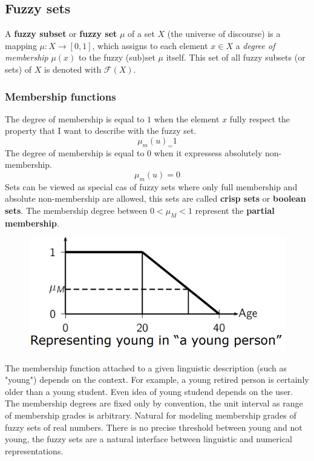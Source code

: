 \documentclass{article}
\begin{document}
\subsection{Fuzzy sets}
A \textbf{fuzzy subset} or \textbf{fuzzy set} $\mu$ of a set $X$ (the universe of
discourse) is a mapping $\mu : X\rightarrow [0,1]$, which assigns to each element $x\in X$
a \textit{degree of membership} $\mu(x)$ to the fuzzy (sub)set $\mu$ itself.
\newline\newline
This set of all fuzzy subsets (or sets) of $X$ is denoted with $\mathcal{F}(X)$.

\subsubsection{Membership functions}
The degree of membership is equal to $1$ when the element $x$ fully respect the property
that I want to describe with the fuzzy set.
$$\mu_m(u)_=1$$
The degree of membership is equal to $0$ when it expressess absolutely non-membership.
$$\mu_m(u)=0$$
Sets can be viewed as special cas of fuzzy sets where only full membership and absolute
non-membership are allowed, this sets are called \textbf{crisp sets} or \textbf{boolean sets}.
The membership degree between $0 < \mu_M <1$ represent the \textbf{partial membership}.
\begin{figure}[H]
    \centering
    \includegraphics[scale=0.5]{images/young.png}
\end{figure}
The membership function attached to a given linguistic description (such as "young") depends
on the context. For example, a young retired person is certainly older than a young student.
Even idea of young studend depends on the user.
\newline\newline
The membership degrees are fixed only by convention, the unit interval as range of membership
grades is arbitrary. Natural for modeling membership grades of fuzzy sets of real numbers.
\newline\newline
There is no precise threshold between young and not young, the fuzzy sets are a natural
interface between linguistic and numerical representations.
\end{document}
